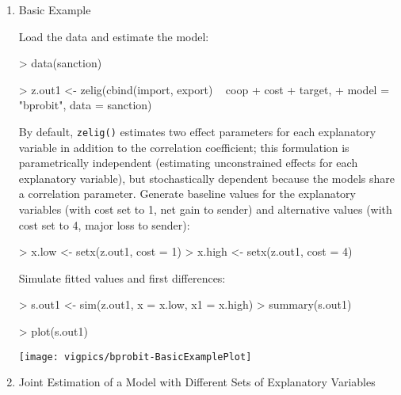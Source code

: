 \documentclass{article}
\begin{document}
\begin{enumerate}

\item {Basic Example} \label{basic.bp}

Load the data and estimate the model:  
\begin{Schunk}
\begin{Sinput}
> data(sanction)
\end{Sinput}
\end{Schunk}
\begin{Schunk}
\begin{Sinput}
> z.out1 <- zelig(cbind(import, export) ~ coop + cost + target, 
+     model = "bprobit", data = sanction)
\end{Sinput}
\end{Schunk}
By default, {\tt zelig()} estimates two effect parameters
for each explanatory variable in addition to the correlation coefficient;
this formulation is parametrically independent (estimating
unconstrained effects for each explanatory variable), but
stochastically dependent because the models share a correlation parameter.
\newline \newline Generate baseline values for the explanatory
variables (with cost set to 1, net gain to sender) and alternative
values (with cost set to 4, major loss to sender):
\begin{Schunk}
\begin{Sinput}
> x.low <- setx(z.out1, cost = 1)
> x.high <- setx(z.out1, cost = 4)
\end{Sinput}
\end{Schunk}
Simulate fitted values and first differences:  
\begin{Schunk}
\begin{Sinput}
> s.out1 <- sim(z.out1, x = x.low, x1 = x.high)
> summary(s.out1)
\end{Sinput}
\end{Schunk}
\begin{center}
\begin{Schunk}
\begin{Sinput}
> plot(s.out1)
\end{Sinput}
\end{Schunk}
\texttt{[image: vigpics/bprobit-BasicExamplePlot]}
\end{center}


\item {Joint Estimation of a Model with Different Sets of Explanatory Variables}\label{sto.dep.probit}


\end{enumerate}
\end{document}

